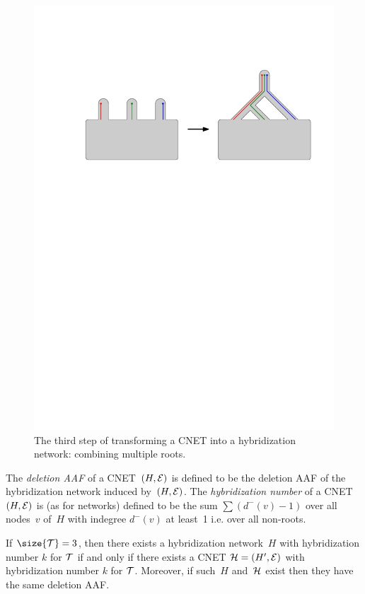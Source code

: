 \begin{figure}[h]
	\centering
		\includegraphics{../figs/ch4/root-joining.pdf}
	\caption{The third step of transforming a CNET into a hybridization network: combining multiple roots.}
	\label{fig:rootjoin}
\end{figure}

The \emph{deletion AAF} of a CNET~$(H, \mathcal{E})$ is defined to be the deletion AAF of the hybridization network induced by~$(H, \mathcal{E})$. {The \emph{hybridization number} of a CNET~$(H, \mathcal{E})$ is (as for networks) defined to be the sum $\sum(d^-(v)-1)$ over all nodes~$v$ of~$H$ with indegree $d^-(v)$ at least~1 i.e. over all non-roots.}

\begin{lem}
  \label{lem:multiroot-is-fine}
  If $\size{\T} = 3$, then there exists a hybridization network~$H$ with
  hybridization number $k$ for $\mathcal{T}$ if and only if there exists a
  CNET $\mathcal{H} = (H', \mathcal{E})$ with hybridization number $k$ for $\mathcal{T}$. Moreover, if such~$H$ and~$\mathcal{H}$ exist then they have the same deletion AAF.
\end{lem}

